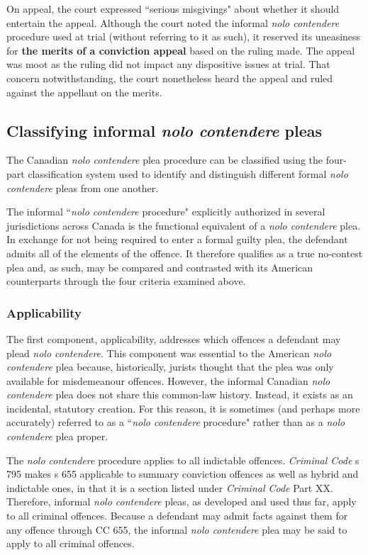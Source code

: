 On appeal, the court expressed ``serious misgivings" about whether it should entertain the appeal. Although the court noted the informal \textit{nolo contendere} procedure used at trial (without referring to it as such), it reserved its uneasiness for \textbf{the merits of a conviction appeal} based on the ruling made. The appeal was moot as the ruling did not impact any dispositive issues at trial. That concern notwithstanding, the court nonetheless heard the appeal and ruled against the appellant on the merits.

\subsection{Classifying informal \textit{nolo contendere} pleas}

The Canadian \textit{nolo contendere} plea procedure can be classified using the four-part classification system used to identify and distinguish different formal \textit{nolo contendere} pleas from one another. 

The informal ``\textit{nolo contendere} procedure" explicitly authorized in several jurisdictions across Canada is the functional equivalent of a \textit{nolo contendere} plea. In exchange for not being required to enter a formal guilty plea, the defendant admits all of the elements of the offence. It therefore qualifies as a true no-contest plea and, as such, may be compared and contrasted with its American counterparts through the four criteria examined above.

\subsubsection{Applicability}

The first component, applicability, addresses which offences a defendant may plead \textit{nolo contendere}. This component was essential to the American \textit{nolo contendere} plea because, historically, jurists thought that the plea was only available for misdemeanour offences. However, the informal Canadian \textit{nolo contendere} plea does not share this common-law history. Instead, it exists as an incidental, statutory creation. For this reason, it is sometimes (and perhaps more accurately) referred to as a ``\textit{nolo contendere} procedure" rather than as a \textit{nolo contendere} plea proper.

The \textit{nolo contendere} procedure applies to all indictable offences. \textit{Criminal Code} s 795 makes s 655 applicable to summary conviction offences as well as hybrid and indictable ones, in that it is a section listed under \textit{Criminal Code} Part XX. Therefore, informal \textit{nolo contendere} pleas, as developed and used thus far, apply to all criminal offences. Because a defendant may admit facts against them for any offence through CC 655, the informal \textit{nolo contendere} plea may be said to apply to all criminal offences.

